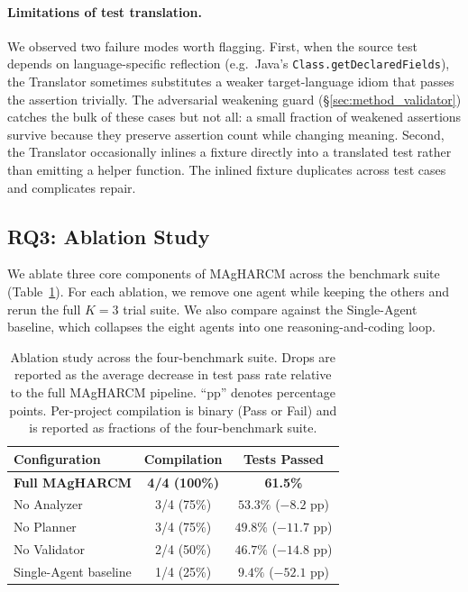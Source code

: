 \paragraph{Limitations of test translation.}
We observed two failure modes worth flagging. First, when the source
test depends on language-specific reflection (e.g.\ Java's
\texttt{Class.getDeclaredFields}), the Translator sometimes
substitutes a weaker target-language idiom that passes the assertion
trivially. The adversarial weakening guard
(§\ref{sec:method_validator}) catches the bulk of these cases but
not all: a small fraction of weakened assertions survive because they
preserve assertion count while changing meaning. Second, the
Translator occasionally inlines a fixture directly into a translated
test rather than emitting a helper function. The inlined fixture
duplicates across test cases and complicates repair.

\subsection{RQ3: Ablation Study}
\label{sec:eval_rq3}

We ablate three core components of MAgHARCM across the benchmark
suite (Table~\ref{tab:ablations}). For each ablation, we remove one
agent while keeping the others and rerun the full $K{=}3$ trial
suite. We also compare against the Single-Agent baseline, which
collapses the eight agents into one reasoning-and-coding loop.

\begin{table}[!t]
\centering
\small
\begin{tabular}{lcc}
\toprule
\textbf{Configuration} & \textbf{Compilation} & \textbf{Tests Passed} \\
\midrule
\textbf{Full MAgHARCM} & \textbf{4/4 (100\%)} & \textbf{61.5\%} \\
No Analyzer & 3/4 (75\%) & $53.3\%$ ($-8.2$ pp) \\
No Planner & 3/4 (75\%) & $49.8\%$ ($-11.7$ pp) \\
No Validator & 2/4 (50\%) & $46.7\%$ ($-14.8$ pp) \\
Single-Agent baseline & 1/4 (25\%) & $9.4\%$ ($-52.1$ pp) \\
\bottomrule
\end{tabular}
\vspace{0.3em}
\caption{Ablation study across the four-benchmark suite. Drops are
reported as the average decrease in test pass rate relative to the
full MAgHARCM pipeline. ``pp'' denotes percentage points. Per-project
compilation is binary (Pass or Fail) and is reported as fractions of
the four-benchmark suite.}
\label{tab:ablations}
\end{table}

